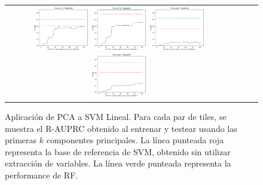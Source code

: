 \begin{figure}[h!]
\begin{tabular}{cccc}
\includegraphics[width=0.25\textwidth]{Kap5/linear_INDIVIDUAL_CURVES_train=b278test=b234.png}  \includegraphics[width=0.25\textwidth]{Kap5/linear_INDIVIDUAL_CURVES_train=b278test=b261.png} 
 \includegraphics[width=0.25\textwidth]{Kap5/linear_INDIVIDUAL_CURVES_train=b360test=b234.png}  \includegraphics[width=0.25\textwidth]{Kap5/linear_INDIVIDUAL_CURVES_train=b360test=b278.png} 
\end{tabular}
\caption{Aplicación de PCA a SVM Lineal. Para cada par de tiles, se muestra el R-AUPRC obtenido al entrenar y testear usando las primeras $k$ componentes principales. La línea punteada roja representa la base de referencia de SVM, obtenido sin utilizar extracción de variables. La línea verde punteada representa la performance de RF.}
\label{fig:pca_l}
\end{figure}

